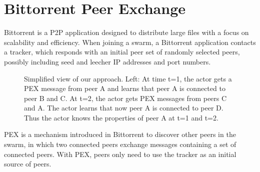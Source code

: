 \documentclass[10pt,conference,letterpaper,final]{IEEEtran}
\begin{document}
\section{Bittorrent Peer Exchange}\label{background}
Bittorrent is a P2P application designed to distribute large files with a focus on scalability and efficiency.  
When joining a swarm, a Bittorrent application contacts a tracker, which responds with an initial peer set of randomly selected peers, possibly including seed and leecher IP addresses and port numbers.  
\begin{figure}
\centering
{}
\caption{Simplified view of our approach. Left: At time t=1, the actor gets a PEX message from peer A and
learns that peer A is connected to peer B and C. At t=2, the actor gets  PEX messages from peers C and A. The actor
learns that now peer A is connected to peer D. Thus the actor knows the properties of peer A at t=1 and t=2.} 
\label{fig:pexworks}
\vspace{-2mm}
\end{figure}
PEX is a mechanism introduced in Bittorrent to discover other peers in the swarm, in which two connected peers exchange messages containing a set of connected peers.  
With PEX, peers only need to use the tracker as an initial source of peers.   
\end{document}
